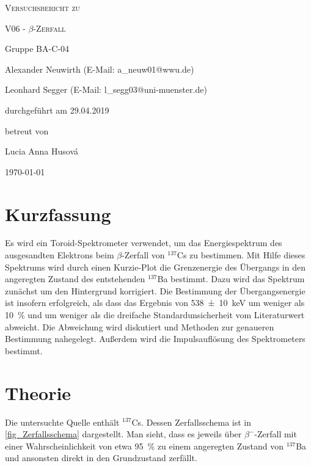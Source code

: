 \documentclass[
	a4paper,
	12pt,
	pagesize,
	ngerman
]{scrartcl}
\begin{document}
	\begin{titlepage}
		\centering
		{\scshape\LARGE Versuchsbericht zu \par}
		\vspace{1cm}
		{\scshape\huge V06 - $\beta$-Zerfall \par}
		\vspace{2.5cm}
		{\LARGE Gruppe BA-C-04 \par}
		\vspace{0.5cm}

		{\large Alexander Neuwirth (E-Mail: a\_neuw01@wwu.de) \par}
		{\large Leonhard Segger (E-Mail: l\_segg03@uni-muenster.de) \par}
		\vfill

		durchgeführt am 29.04.2019\par
		betreut von\par
		{\large Lucia Anna Husová}

		\vfill

		{\large \today\par}
	\end{titlepage}
	\tableofcontents
	\newpage


	\section{Kurzfassung}
	Es wird ein Toroid-Spektrometer verwendet, um das Energiespektrum des ausgesandten Elektrons beim $\beta$-Zerfall von $^{137}$Cs zu bestimmen.
	Mit Hilfe dieses Spektrums wird durch einen Kurzie-Plot die Grenzenergie des Übergangs in den angeregten Zustand des entstehenden $^{137}$Ba bestimmt.
	Dazu wird das Spektrum zunächst um den Hintergrund korrigiert.
	Die Bestimmung der Übergangsenergie ist insofern erfolgreich, als dass das Ergebnis von \SI{538 \pm 10}{keV} um weniger als \SI{10}{\percent} und um weniger als die dreifache Standardunsicherheit vom Literaturwert abweicht.
	Die Abweichung wird diskutiert und Methoden zur genaueren Bestimmung nahegelegt.
	Außerdem wird die Impulsauflösung des Spektrometers bestimmt.

  \section{Theorie}
	Die untersuchte Quelle enthält $^{137}$Cs.
	Dessen Zerfallsschema ist in \cref{fig_Zerfallsschema} dargestellt.
	Man sieht, dass es jeweils über $\beta^-$-Zerfall mit einer Wahrscheinlichkeit von etwa \SI{95}{\percent} zu einem angeregten Zustand von $^{137}$Ba und ansonsten direkt in den Grundzustand zerfällt.
\end{document}
